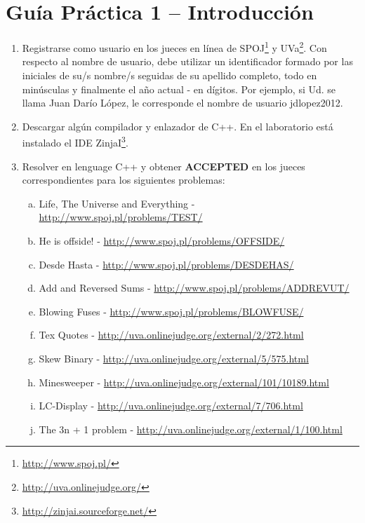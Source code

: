 




\section*{Gu\'ia Pr\'actica 1 -- Introducción}

\begin{enumerate}[1 -]


	\item Registrarse como usuario en los jueces en línea de SPOJ\footnote{\href{http://www.spoj.pl/} {http://www.spoj.pl/}} y UVa\footnote{\href{http://uva.onlinejudge.org/} {http://uva.onlinejudge.org/}}.
Con respecto al nombre de usuario, debe utilizar un identificador formado por las iniciales de su/s nombre/s seguidas de su apellido completo, todo en minúsculas y finalmente el año actual - en dígitos. Por ejemplo, si Ud. se llama Juan Darío López, le corresponde el nombre de usuario jdlopez2012.

	\item Descargar alg\'un compilador y enlazador de C++. En el laboratorio est\'a instalado el IDE ZinjaI\footnote{\href{http://zinjai.sourceforge.net/} {http://zinjai.sourceforge.net/}}.
	
	\item Resolver en lenguage C++ y obtener \textbf{ACCEPTED} en los jueces correspondientes para los siguientes problemas:
	
	\begin{enumerate}[a)]
	
		\item Life, The Universe and Everything - \href{http://www.spoj.pl/problems/TEST/} {http://www.spoj.pl/problems/TEST/}
		\item He is offside! - \href{http://www.spoj.pl/problems/OFFSIDE/}{http://www.spoj.pl/problems/OFFSIDE/}
		\item Desde Hasta - \href{http://www.spoj.pl/problems/DESDEHAS/}{http://www.spoj.pl/problems/DESDEHAS/}
		\item Add and Reversed Sums - \href{http://www.spoj.pl/problems/ADDREVUT/}{http://www.spoj.pl/problems/ADDREVUT/} 
		\item Blowing Fuses - \href{http://www.spoj.pl/problems/BLOWFUSE/}{http://www.spoj.pl/problems/BLOWFUSE/} 
		\item Tex Quotes - \href{http://uva.onlinejudge.org/external/2/272.html}{http://uva.onlinejudge.org/external/2/272.html} 
		\item Skew Binary - \href{http://uva.onlinejudge.org/external/5/575.html}{http://uva.onlinejudge.org/external/5/575.html}
		\item Minesweeper - \href{http://uva.onlinejudge.org/external/101/10189.html}{http://uva.onlinejudge.org/external/101/10189.html} 	
		\item LC-Display - \href{http://uva.onlinejudge.org/external/7/706.html}{http://uva.onlinejudge.org/external/7/706.html} 	
		\item The 3n + 1 problem - \href{http://uva.onlinejudge.org/external/1/100.html}{http://uva.onlinejudge.org/external/1/100.html} 	
	\end{enumerate}
	

\end{enumerate}

